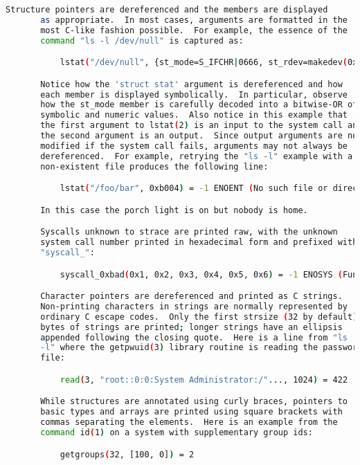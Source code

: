 {{\begin{lstlisting}[language=bash]
       Structure pointers are dereferenced and the members are displayed
       as appropriate.  In most cases, arguments are formatted in the
       most C-like fashion possible.  For example, the essence of the
       command "ls -l /dev/null" is captured as:

           lstat("/dev/null", {st_mode=S_IFCHR|0666, st_rdev=makedev(0x1, 0x3), ...}) = 0

       Notice how the 'struct stat' argument is dereferenced and how
       each member is displayed symbolically.  In particular, observe
       how the st_mode member is carefully decoded into a bitwise-OR of
       symbolic and numeric values.  Also notice in this example that
       the first argument to lstat(2) is an input to the system call and
       the second argument is an output.  Since output arguments are not
       modified if the system call fails, arguments may not always be
       dereferenced.  For example, retrying the "ls -l" example with a
       non-existent file produces the following line:

           lstat("/foo/bar", 0xb004) = -1 ENOENT (No such file or directory)

       In this case the porch light is on but nobody is home.

       Syscalls unknown to strace are printed raw, with the unknown
       system call number printed in hexadecimal form and prefixed with
       "syscall_":

           syscall_0xbad(0x1, 0x2, 0x3, 0x4, 0x5, 0x6) = -1 ENOSYS (Function not implemented)

       Character pointers are dereferenced and printed as C strings.
       Non-printing characters in strings are normally represented by
       ordinary C escape codes.  Only the first strsize (32 by default)
       bytes of strings are printed; longer strings have an ellipsis
       appended following the closing quote.  Here is a line from "ls
       -l" where the getpwuid(3) library routine is reading the password
       file:

           read(3, "root::0:0:System Administrator:/"..., 1024) = 422

       While structures are annotated using curly braces, pointers to
       basic types and arrays are printed using square brackets with
       commas separating the elements.  Here is an example from the
       command id(1) on a system with supplementary group ids:

           getgroups(32, [100, 0]) = 2


\end{lstlisting}}}
